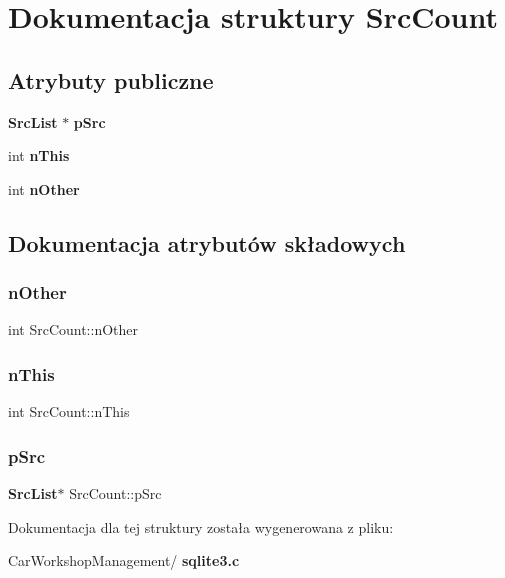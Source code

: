 \section{Dokumentacja struktury Src\+Count}
\label{struct_src_count}
\subsection*{Atrybuty publiczne}
\begin{DoxyCompactItemize}
\item 
\textbf{ Src\+List} $\ast$ \textbf{ p\+Src}
\item 
int \textbf{ n\+This}
\item 
int \textbf{ n\+Other}
\end{DoxyCompactItemize}


\subsection{Dokumentacja atrybutów składowych}
\mbox{\label{struct_src_count_a5666f8571b2877fdadfe95364ffb5b80}} 
\subsubsection{nOther}
{\footnotesize\ttfamily int Src\+Count\+::n\+Other}

\mbox{\label{struct_src_count_a1aaa40ff75460ebc7778ea63aca14d4d}} 
\subsubsection{nThis}
{\footnotesize\ttfamily int Src\+Count\+::n\+This}

\mbox{\label{struct_src_count_a7087f00bcaed39cc5032462d7262f4ff}} 
\subsubsection{pSrc}
{\footnotesize\ttfamily \textbf{ Src\+List}$\ast$ Src\+Count\+::p\+Src}



Dokumentacja dla tej struktury została wygenerowana z pliku\+:\begin{DoxyCompactItemize}
\item 
Car\+Workshop\+Management/\textbf{ sqlite3.\+c}\end{DoxyCompactItemize}
